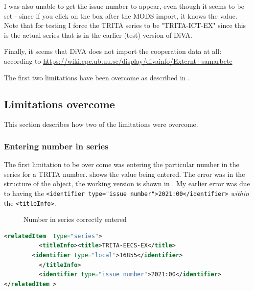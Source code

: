 I was also unable to get the issue number to appear, even though it seems to be set - since if you click on the box after the MODS import, it knows the value.  Note that for testing I force the TRITA series to be "TRITA-ICT-EX" since this is the actual series that is in the earlier (test) version of DiVA.

Finally, it seems that DiVA does not import the cooperation data at all: according to \url{https://wiki.epc.ub.uu.se/display/divainfo/Externt+samarbete}

The first two limitations have been overcome as described in .

\subsection{Limitations overcome}
\label{sec:limitationsOvercome}
This section describes how two of the limitations were overcome.

\subsubsection{Entering number in series}
The first limitation to be over come was entering the particular number in the series for a TRITA number.  shows the value being entered. The error was in the structure of the object, the working version is shown in . My earlier error was due to having the \texttt{<identifier type="issue number">2021:00</identifier>} \textit{within} the \texttt{<titleInfo>}.
 
 
\begin{figure}[!ht]
  \begin{center}
  \end{center}
  \caption{Number in series correctly entered}
  \label{fig:numberInSeriesCorrectlyEntered}
\end{figure}
\begin{lstlisting}[language={XML}, caption={MODS data for series}, label=lst:seriesNumber]
<relatedItem  type="series">
	      <titleInfo><title>TRITA-EECS-EX</title>
		<identifier type="local">16855</identifier>
	      </titleInfo>
	      <identifier type="issue number">2021:00</identifier>
</relatedItem >
\end{lstlisting}


